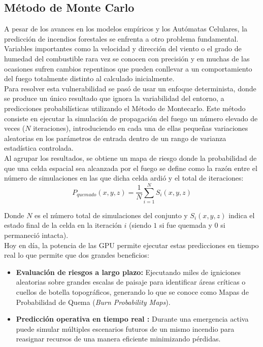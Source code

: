     \subsection{Método de Monte Carlo}
        A pesar de los avances en los modelos empíricos y los Autómatas Celulares, la predicción de incendios forestales se enfrenta a otro problema fundamental. Variables importantes como la velocidad y dirección del viento o el grado de humedad del combustible rara vez se conocen con precisión y en muchas de las ocasiones sufren cambios repentinos que pueden conllevar a un comportamiento del fuego totalmente distinto al calculado inicialmente.\\

        Para resolver esta vulnerabilidad se pasó de usar un enfoque determinista, donde se produce un único resultado que ignora la variabilidad del entorno, a predicciones probabilísticas utilizando el Método de Montecarlo. 
        Este método consiste en ejecutar la simulación de propagación del fuego un número elevado de veces ($N$ iteraciones), introduciendo en cada una de ellas pequeñas variaciones aleatorias en los parámetros de entrada dentro de un rango de varianza estadística controlada\cite{CARMEL2009370}.\\

        Al agrupar los resultados, se obtiene un  mapa de riesgo donde la probabilidad de que una celda espacial sea alcanzada por el fuego se define como la razón entre el número de simulaciones en las que dicha celda ardió y el total de iteraciones\cite{montecarlo_mdpi}:
        $$P_{quemado}(x,y,z) = \frac{1}{N} \sum_{i=1}^{N} S_i(x,y,z)$$

        Donde $N$ es el número total de simulaciones del conjunto y $S_i(x,y,z)$ indica el estado final de la celda en la iteración $i$ (siendo $1$ si fue quemada y $0$ si permaneció intacta).\\ 

        Hoy en día, la potencia de las GPU permite ejecutar estas predicciones en tiempo real lo que permite que dos grandes beneficios:\\
        \begin{itemize}
            \item \textbf{Evaluación de riesgos a largo plazo:} Ejecutando miles de igniciones aleatorias sobre grandes escalas de paisaje para identificar áreas críticas o cuellos de botella topográficos, generando lo que se conoce como Mapas de Probabilidad de Quema (\textit{Burn Probability Maps}).

        \item \textbf{Predicción operativa en tiempo real :} Durante una emergencia activa puede simular múltiples escenarios futuros de un mismo incendio para reasignar recursos de una manera eficiente minimizando pérdidas.

        \end{itemize}


